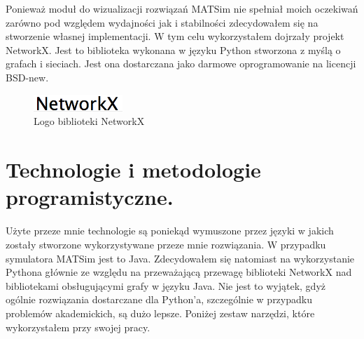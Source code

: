 \documentclass[twoside,12pt]{report}
\begin{document}
Ponieważ moduł do wizualizacji rozwiązań MATSim nie spełniał moich oczekiwań zarówno pod względem wydajności jak i stabilności zdecydowałem się na stworzenie własnej implementacji. W tym celu wykorzystałem dojrzały projekt NetworkX. Jest to biblioteka wykonana w języku Python stworzona z myślą o grafach i sieciach. Jest ona dostarczana jako darmowe oprogramowanie na licencji BSD-new\cite{networkx}. 

\begin{figure}[ht]
\centering
\includegraphics[width=0.30\textwidth]{img/networkx}
\caption{Logo biblioteki NetworkX} 
\end{figure}

\section{Technologie i metodologie programistyczne.}

Użyte przeze mnie technologie są poniekąd wymuszone przez języki w jakich zostały stworzone wykorzystywane przeze mnie rozwiązania. W przypadku symulatora MATSim jest to Java. Zdecydowałem się natomiast na wykorzystanie Pythona głównie ze względu na przeważającą przewagę biblioteki NetworkX nad bibliotekami obsługującymi grafy w języku Java. Nie jest to wyjątek, gdyż ogólnie rozwiązania dostarczane dla Python'a, szczególnie w przypadku problemów akademickich, są dużo lepsze. Poniżej zestaw narzędzi, które wykorzystałem przy swojej pracy.  
\end{document}
